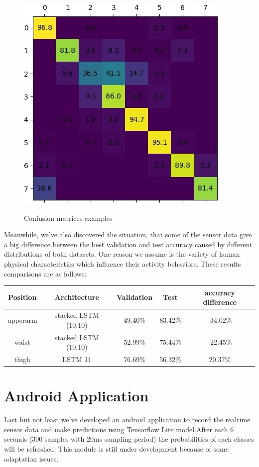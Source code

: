 \documentclass[landscape,a3,final,24pt]{issposter}
\begin{document}
\begin{multicols}{3}
\begin{figure}[htbp]
{\includegraphics[scale=0.5]{Pictures/chest.jpg}
}
\caption{Confusion matrices examples}
\end{figure}

Meanwhile, we've also discovered the situation, that some of the sensor data give a big difference between the best validation and test accuracy caused by different distributions of both datasets. One reason we assume is the variety of human physical characteristics which influence their activity behaviors. These results comparisons are as follows:
\begin{center}
\begin{tabular}{ccccc}
   \toprule
  Position& Architecture  & Validation&Test&accuracy difference \\
  \midrule
  upperarm	&stacked LSTM (10,10)	&49.40\%	&83.42\%	&-34.02\%\\
waist	&stacked LSTM (10,10)	&52.99\%	&75.44\%	&-22.45\%\\
thigh	&LSTM 11	&76.69\%	&56.32\%	&20.37\%\\
   \bottomrule
\end{tabular}
\end{center}
\section{Android Application}
Last but not least we've developed an android application to record the realtime sensor data and make predictions using Tensorflow Lite model.After each 6 seconds (300 samples with 20ms sampling period) the probabilities of each classes will be refreshed. This module is still under development because of some adaptation issues.


\end{multicols}
\end{document}
